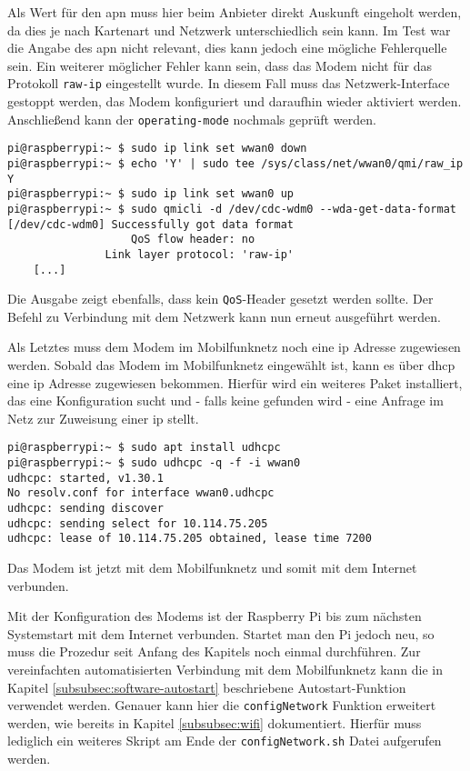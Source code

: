 \noindent Als Wert für den \gls{apn} muss hier beim Anbieter direkt Auskunft eingeholt werden, da dies je nach Kartenart und Netzwerk
unterschiedlich sein kann.
Im Test war die Angabe des \gls{apn} nicht relevant, dies kann jedoch eine mögliche Fehlerquelle sein.
Ein weiterer möglicher Fehler kann sein, dass das Modem nicht für das Protokoll \texttt{raw-ip} eingestellt wurde.
In diesem Fall muss das Netzwerk-Interface gestoppt werden, das Modem konfiguriert und daraufhin wieder aktiviert werden.
Anschließend kann der \texttt{operating-mode} nochmals geprüft werden.

\begin{lstlisting}
pi@raspberrypi:~ $ sudo ip link set wwan0 down
pi@raspberrypi:~ $ echo 'Y' | sudo tee /sys/class/net/wwan0/qmi/raw_ip
Y
pi@raspberrypi:~ $ sudo ip link set wwan0 up
pi@raspberrypi:~ $ sudo qmicli -d /dev/cdc-wdm0 --wda-get-data-format
[/dev/cdc-wdm0] Successfully got data format
                   QoS flow header: no
               Link layer protocol: 'raw-ip'
    [...]
\end{lstlisting}

\noindent Die Ausgabe zeigt ebenfalls, dass kein \texttt{QoS}-Header gesetzt werden sollte.
Der Befehl zu Verbindung mit dem Netzwerk kann nun erneut ausgeführt werden.

Als Letztes muss dem Modem im Mobilfunknetz noch eine \gls{ip} Adresse zugewiesen werden.
Sobald das Modem im Mobilfunknetz eingewählt ist, kann es über \gls{dhcp} eine \gls{ip} Adresse zugewiesen bekommen.
Hierfür wird ein weiteres Paket installiert, das eine Konfiguration sucht und - falls keine gefunden wird - eine
Anfrage im Netz zur Zuweisung einer \gls{ip} stellt.

\begin{lstlisting}
pi@raspberrypi:~ $ sudo apt install udhcpc
pi@raspberrypi:~ $ sudo udhcpc -q -f -i wwan0
udhcpc: started, v1.30.1
No resolv.conf for interface wwan0.udhcpc
udhcpc: sending discover
udhcpc: sending select for 10.114.75.205
udhcpc: lease of 10.114.75.205 obtained, lease time 7200
\end{lstlisting}

\noindent Das Modem ist jetzt mit dem Mobilfunknetz und somit mit dem Internet verbunden.


Mit der Konfiguration des Modems ist der Raspberry Pi bis zum nächsten Systemstart mit dem Internet verbunden.
Startet man den Pi jedoch neu, so muss die Prozedur seit Anfang des Kapitels noch einmal durchführen.
Zur vereinfachten automatisierten Verbindung mit dem Mobilfunknetz kann die in Kapitel \ref{subsubsec:software-autostart}
beschriebene Autostart-Funktion verwendet werden.
Genauer kann hier die \texttt{configNetwork} Funktion erweitert werden, wie bereits in Kapitel \ref{subsubsec:wifi}
dokumentiert.
Hierfür muss lediglich ein weiteres Skript am Ende der \texttt{configNetwork.sh} Datei aufgerufen werden.

